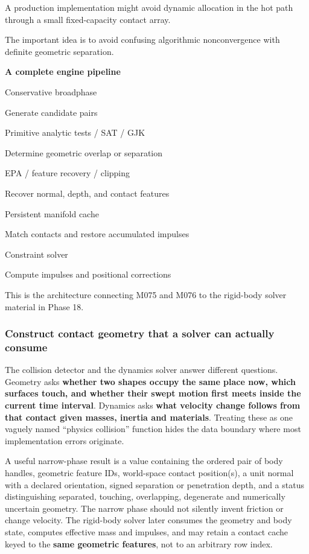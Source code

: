 A production implementation might avoid dynamic allocation in the hot path through a small fixed-capacity contact array.

The important idea is to avoid confusing algorithmic nonconvergence with definite geometric separation.

\textbf{A complete engine pipeline}

Conservative broadphase

Generate candidate pairs

Primitive analytic tests / SAT / GJK

Determine geometric overlap or separation

EPA / feature recovery / clipping

Recover normal, depth, and contact features

Persistent manifold cache

Match contacts and restore accumulated impulses

Constraint solver

Compute impulses and positional corrections

This is the architecture connecting M075 and M076 to the rigid-body solver material in Phase 18.

\subsubsection{Construct contact geometry that a solver can actually consume}\label{04-visual-computing-ii-ch026-construct-contact-geometry-that-a-solver-can-actually-consume}

The collision detector and the dynamics solver answer different questions. Geometry asks \textbf{whether two shapes occupy the same place now, which surfaces touch, and whether their swept motion first meets inside the current time interval}. Dynamics asks \textbf{what velocity change follows from that contact given masses, inertia and materials}. Treating these as one vaguely named ``physics collision'' function hides the data boundary where most implementation errors originate.

A useful narrow-phase result is a value containing the ordered pair of body handles, geometric feature IDs, world-space contact position(s), a unit normal with a declared orientation, signed separation or penetration depth, and a status distinguishing separated, touching, overlapping, degenerate and numerically uncertain geometry. The narrow phase should not silently invent friction or change velocity. The rigid-body solver later consumes the geometry and body state, computes effective mass and impulses, and may retain a contact cache keyed to the \textbf{same geometric features}, not to an arbitrary row index.

